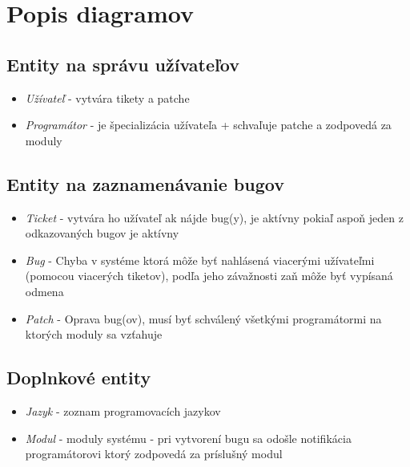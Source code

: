 \documentclass[11pt, a4paper]{article}
\begin{document}
	\newpage
	\section{Popis diagramov}
	\subsection{Entity na správu užívateľov}

	\begin{itemize}
	\item \emph{Užívateľ} - vytvára tikety a patche
	\item \emph{Programátor} - je špecializácia užívateľa + schvaľuje patche a zodpovedá za moduly
	\end{itemize}

	\subsection{Entity na zaznamenávanie bugov}

	\begin{itemize}
	\item \emph{Ticket} - vytvára ho užívateľ ak nájde bug(y), je aktívny pokiaľ aspoň jeden z odkazovaných bugov je aktívny
	\item \emph{Bug} - Chyba v systéme ktorá môže byť nahlásená viacerými užívateľmi (pomocou viacerých tiketov), podľa jeho závažnosti zaň môže byť vypísaná odmena
	\item \emph{Patch} - Oprava bug(ov), musí byť schválený všetkými programátormi na ktorých moduly sa vzťahuje
	\end{itemize}

	\subsection{Doplnkové entity}

	\begin{itemize}
	\item \emph{Jazyk} - zoznam programovacích jazykov
	\item \emph{Modul} - moduly systému - pri vytvorení bugu sa odošle notifikácia programátorovi ktorý zodpovedá za príslušný modul
	\end{itemize}
\end{document}
